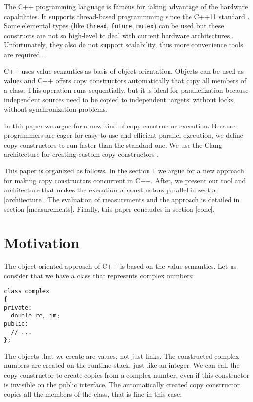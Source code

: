 \documentclass{article}
\begin{document}
The C++ programming language is famous for taking advantage of the hardware capabilities. It
supports thread-based programmming since the C++11 standard \cite{batty:math}. Some elemental
types (like \texttt{thread}, \texttt{future}, \texttt{mutex}) can be used but these constructs
are not so high-level to deal with current hardware architectures \cite{stroustrup:cpp}.
Unfortunately, they also do not support scalability, thus more convenience tools are
required \cite{lupin:fastflow,lupin:multicore,lupin:stl}.

C++ uses value semantics as basis of object-orientation. Objects can be used as values and C++
offers copy constructors automatically that copy all members of a class. This operation runs
sequentially, but it is ideal for parallelization because independent sources need to be copied
to independent targets: without locks, without synchronization problems.

In this paper we argue for a new kind of copy constructor execution. Because programmers are eager
for easy-to-use and efficient parallel execution, we define copy constructors to run faster than
the standard one. We use the Clang architecture for creating custom copy constructors \cite{lattner:clang}.

This paper is organized as follows. In the section \ref{motivation} we argue for a new approach
for making copy constructors concurrent in C++. After, we present our tool and architecture that
makes the execution of constructors parallel in section \ref{architecture}. The evaluation of
measurements and the approach is detailed in section \ref{measurements}. Finally, this paper
concludes in section \ref{conc}.

\section{Motivation}
\label{motivation}

The object-oriented approach of C++ is based on the value semantics. Let us consider that we
have a class that represents complex numbers:

\begin{verbatim}
class complex
{
private:
  double re, im;
public:
  // ...
};
\end{verbatim}

The objects that we create are values, not just links. The constructed complex numbers are
created on the runtime stack, just like an integer. We can call the copy constructor to
create copies from a complex number, even if this constructor is invisible on the public
interface. The automatically created copy constructor copies all the members of the class,
that is fine in this case:
\end{document}
